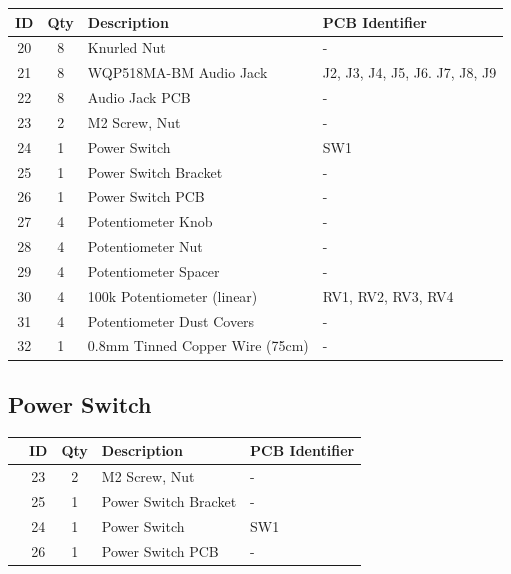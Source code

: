\documentclass[12pt, a4paper]{article}
\newcommand{\checkbox}[1]{\CheckBox[backgroundcolor=0.86 0.828 0.71, name=#1]{}}
\begin{document}
\begin{center}
    \small
    \setlength\extrarowheight{4pt}
    \begin{tabularx}{\textwidth}{|c|c|X|l|}
        \hline \rowcolor{lightgray} ID & Qty & Description & PCB Identifier\\
        \hline 20 & 8 & Knurled Nut & -\\
        \hline 21 & 8 & WQP518MA-BM Audio Jack & J2, J3, J4, J5, J6. J7, J8, J9\\
        \hline 22 & 8 & Audio Jack PCB & -\\
        \hline 23 & 2 & M2 Screw, Nut & -\\
        \hline 24 & 1 & Power Switch & SW1\\
        \hline 25 & 1 & Power Switch Bracket & -\\
        \hline 26 & 1 & Power Switch PCB & -\\
        \hline 27 & 4 & Potentiometer Knob & -\\
        \hline 28 & 4 & Potentiometer Nut & -\\
        \hline 29 & 4 & Potentiometer Spacer & -\\
        \hline 30 & 4 & 100k Potentiometer (linear) & RV1, RV2, RV3, RV4\\
        \hline 31 & 4 & Potentiometer Dust Covers & -\\
        \hline 32 & 1 & 0.8mm Tinned Copper Wire (75cm) & -\\
        \hline
    \end{tabularx}
\end{center}

\pagebreak
\subsection{Power Switch}

\begin{center}
    \small
    \setlength\extrarowheight{8pt}
    \begin{tabularx}{\textwidth}{|c|c|c|X|l|}
        \hline\rowcolor{lightgray} & ID & Qty & Description & PCB Identifier\\
        \hline\checkbox{ha} & 23 & 2 & M2 Screw, Nut & -\\
        \hline\checkbox{hb} & 25 & 1 & Power Switch Bracket & -\\
        \hline\checkbox{hc} & 24 & 1 & Power Switch & SW1\\
        \hline\checkbox{hd} & 26 & 1 & Power Switch PCB & -\\
        \hline
    \end{tabularx}
\end{center}
\end{document}
